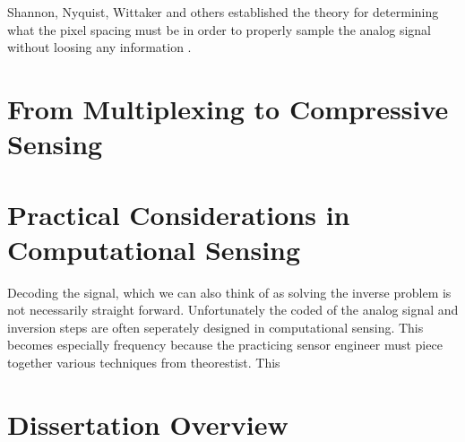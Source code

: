 Shannon, Nyquist, Wittaker and others established the theory for determining what the pixel spacing must be in order to properly sample the analog signal without loosing any information \cite{shannon1949communication, nyquist1924certain, nyquist1928certain}. 

\section{From Multiplexing to Compressive Sensing}\label{sec:multiplexingtocompressivesensing}

\section{Practical Considerations in Computational Sensing}

Decoding the signal, which we can also think of as solving the inverse problem is not necessarily straight forward. Unfortunately the coded of the analog signal and inversion steps are often seperately designed in computational sensing. This becomes especially frequency because the practicing sensor engineer must piece together various techniques from theorestist. This 

\section{Dissertation Overview}



%  
%

